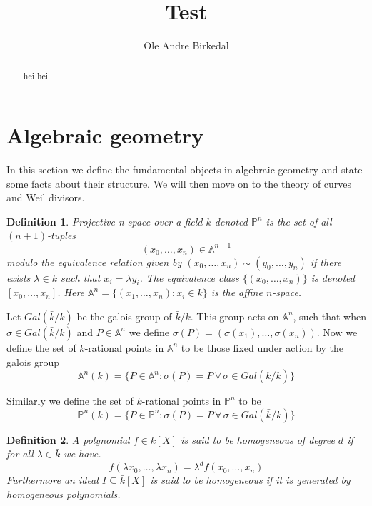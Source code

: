 \documentclass[a4paper,10pt]{amsart}
\title{Test}
\author{Ole Andre Birkedal}
\begin{document}
\newtheorem{thm}{Theorem}
\newtheorem{mydef}{Definition}
\newtheorem{ex}{Example}
\newtheorem{prop}{Proposition}
\newtheorem{lemma}{Lemma}

\begin{abstract}
hei hei
\end{abstract}

\maketitle


\section{Algebraic geometry}
In this section we define the fundamental objects in algebraic geometry and state
some facts about their structure. We will then move on to the theory of
curves and Weil divisors.

\begin{mydef}
\emph{Projective n-space} over a field $k$ denoted $\mathbb{P}^n$ is the set 
of all $(n+1)$-tuples $$(x_0,\ldots,x_n)\in\mathbb{A}^{n+1}$$
modulo the equivalence relation given by $(x_0,\ldots,x_n)\sim(y_0,\ldots,y_n)$ 
if there exists $\lambda\in k$ such that $x_i=\lambda y_i$.
The equivalence class $\{(x_0,\ldots,x_n)\}$ is denoted $[x_0,\ldots,x_n]$.
Here $\mathbb{A}^n = \{ (x_1,\ldots,x_n) : x_i \in \bar{k} \} $ is the affine $n$-space.
\end{mydef}

Let $Gal(\bar{k}/k)$ be the galois group of $\bar{k}/k$. This group acts on
$\mathbb{A}^n$, such that when $\sigma \in Gal(\bar{k}/k)$ and $P\in \mathbb{A}^n$
we define $\sigma(P) = (\sigma(x_1),\ldots,\sigma(x_n))$. Now we define
the set of $k$-rational points in $\mathbb{A}^n$ to be those fixed under action by
the galois group
$$ \mathbb{A}^n(k) = \{ P \in \mathbb{A}^n : \sigma(P) = P\, \forall\, \sigma \in
Gal(\bar{k}/k) \} $$

Similarly we define the set of $k$-rational points in $\mathbb{P}^n$ to be
$$ \mathbb{P}^n(k) = \{ P \in \mathbb{P}^n : \sigma(P) = P\, \forall\, \sigma \in 
Gal(\bar{k}/k) \} $$

\begin{mydef}
 A polynomial $f\in\bar{k}[X]$ is said to be \emph{homogeneous of degree $d$} if for all
$\lambda\in\bar{k}$ we have.
$$f(\lambda x_0,\ldots,\lambda x_n) = \lambda^d f(x_0,\ldots,x_n)$$
Furthermore an ideal $I\subseteq\bar{k}[X]$ is said to be homogeneous if it is generated
by homogeneous polynomials.
\end{mydef}
\end{document}
